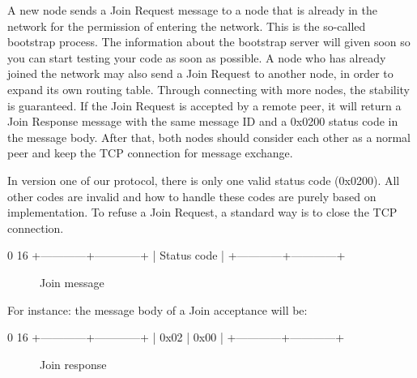 \documentclass[12pt, a4paper]{article}
\begin{document}
A new node sends a Join Request message to a node that is already in the network for the permission of entering the network.
This is the so-called bootstrap process.
The information about the bootstrap server will given soon so you can start testing your code as soon as possible.
A node who has already joined the network may also send a Join Request to another node, in order to expand its own routing table.
Through connecting with more nodes, the stability is guaranteed.
If the Join Request is accepted by a remote peer, it will return a Join Response message with the same message ID and a 0x0200 status code in the message body.
After that, both nodes should consider each other as a normal peer and keep the TCP connection for message exchange.

In version one of our protocol, there is only one valid status code (0x0200).
All other codes are invalid and how to handle these codes are purely based on implementation.
To refuse a Join Request, a standard way is to close the TCP connection.

\begin{verbbox}
0                          16
+------------+------------+
|      Status code        |
+------------+------------+
\end{verbbox}

\begin{figure}[h!]
  \centering
  \theverbbox
  \label{joinrequest}
  \caption{Join message}
\end{figure}

For instance: the message body of a Join acceptance will be:
\begin{verbbox}
0                          16
+------------+------------+
|    0x02    |    0x00    |
+------------+------------+
\end{verbbox}

\begin{figure}[h!]
  \centering
  \theverbbox
  \label{header}
  \caption{Join response}
\end{figure}
\end{document}
